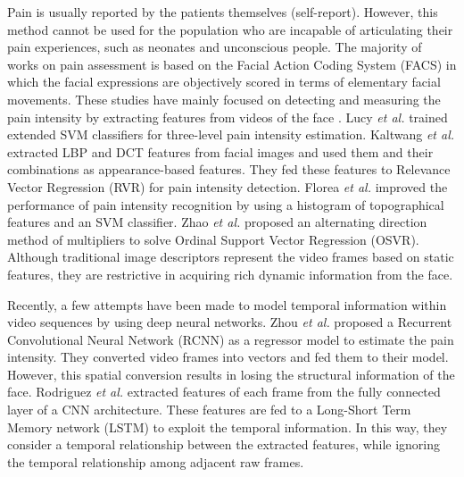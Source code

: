 \documentclass[a4paper,conference]{IEEEtran}
\begin{document}
Pain is usually reported by the patients themselves (self-report). However, this method cannot be used for the population who are incapable of articulating their pain experiences, such as neonates and unconscious people. The majority of works on pain assessment is based on the Facial Action Coding System (FACS) \cite{c5} in which the facial expressions are objectively scored in terms of elementary facial movements. These studies have mainly focused on detecting and measuring the pain intensity by extracting features from videos of the face \cite{c6,c7}. Lucy \emph{et al.} \cite{c7} trained extended SVM classifiers for three-level pain intensity estimation. Kaltwang \emph{et al.} \cite{c8} extracted LBP and DCT features from facial images and used them and their combinations as appearance-based features. They fed these features to Relevance Vector Regression (RVR) for pain intensity detection. Florea \emph{et al.} \cite{c9} improved the performance of pain intensity recognition by using a histogram of topographical features and an SVM classifier. Zhao \emph{et al.} \cite{c10} proposed an alternating direction method of multipliers to solve Ordinal Support Vector Regression (OSVR). Although traditional image descriptors represent the video frames based on static features, they are restrictive in acquiring rich dynamic information from the face. 

Recently, a few attempts have been made to model temporal information within video sequences by using deep neural networks. Zhou \emph{et al.} \cite{c11} proposed a Recurrent Convolutional Neural Network (RCNN) as a regressor model to estimate the pain intensity. They converted video frames into vectors and fed them to their model. However, this spatial conversion results in losing the structural information of the face. Rodriguez \emph{et al.} \cite{c12} extracted features of each frame from the fully connected layer of a CNN architecture. These features are fed to a Long-Short Term Memory network (LSTM) to exploit the temporal information. In this way, they consider a temporal relationship between the extracted features, while ignoring the temporal relationship among adjacent raw frames.
\end{document}
